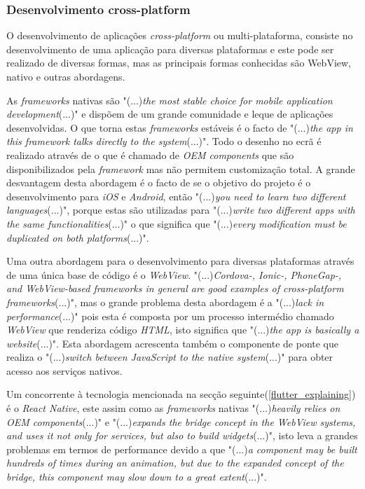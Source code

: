 \subsubsection{Desenvolvimento cross-platform}
O desenvolvimento de aplicações \textit{cross-platform} ou multi-plataforma, consiste no desenvolvimento de uma aplicação para diversas plataformas e este pode ser realizado de diversas formas, mas as principais formas conhecidas são WebView, nativo e outras abordagens.

As \emph{frameworks} nativas são "(...)\emph{the most stable choice for mobile application development}(...)"\citep{flutter} e dispõem de um grande comunidade e leque de aplicações desenvolvidas. O que torna estas \textit{frameworks} estáveis é o facto de "(...)\emph{the app in this framework talks directly to the system}(...)"\citep{flutter}. Todo o desenho no ecrã é realizado através de o que é chamado de \emph{OEM components} que são disponibilizados pela \emph{framework} mas não permitem customização total. A grande desvantagem desta abordagem é o facto de se o objetivo do projeto é o desenvolvimento para \textit{iOS} e \textit{Android}, então "(...)\emph{you need to learn two different languages}(...)"\citep{flutter}, porque estas são utilizadas para "(...)\emph{write two different apps with the same functionalities}(...)"\citep{flutter} o que significa que "(...)\emph{every modification must be duplicated on both platforms}(...)"\citep{flutter}.

Uma outra abordagem para o desenvolvimento para diversas plataformas através de uma única base de código é o \textit{WebView}. "(...)\emph{Cordova-, Ionic-, PhoneGap-, and WebView-based frameworks in general are good examples of cross-platform frameworks}(...)"\citep{flutter}, mas o grande problema desta abordagem é a "(...)\emph{lack in performance}(...)"\citep{flutter} pois esta é composta por um processo intermédio chamado \textit{WebView} que renderiza código \textit{HTML}, isto significa que "(...)\emph{the app is basically a website}(...)"\citep{flutter}.
Esta abordagem acrescenta também o componente de ponte que realiza o "(...)\emph{switch between JavaScript to the native system}(...)"\citep{flutter} para obter acesso aos serviços nativos.

Um concorrente à tecnologia mencionada na secção seguinte(\ref{flutter_explaining}) é o \textit{React Native}, este assim como as \textit{frameworks} nativas "(...)\emph{heavily relies on OEM components}(...)"\citep{flutter} e "(...)\emph{expands the bridge concept in the WebView systems, and uses it not only for services, but also to build widgets}(...)"\citep{flutter}, isto leva a grandes problemas em termos de performance devido a que "(...)\emph{a component may be built hundreds of times during an animation, but due to the expanded concept of the bridge, this component may slow down to a great extent}(...)"\citep{flutter}.